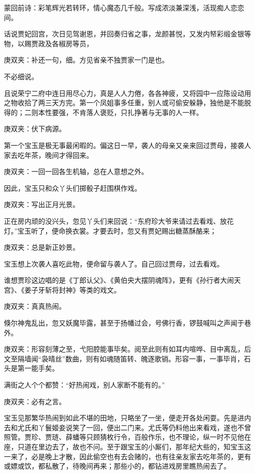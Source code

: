 

\begin{parag}
    \begin{note}蒙回前诗：彩笔辉光若转环，情心魔态几千般。写成浓淡兼深浅，活现痴人恋恋间。\end{note}
\end{parag}


\begin{parag}
    话说贾妃回宫，次日见驾谢恩，并回奏归省之事，龙颜甚悦，又发内帑彩缎金银等物，以赐贾政及各椒房等员，\begin{note}庚双夹：补还一句，细。方见省亲不独贾家一门是也。\end{note}不必细说。
\end{parag}


\begin{parag}
    且说荣宁二府中连日用尽心力，真是人人力倦，各各神疲，又将园中一应陈设动用之物收拾了两三天方完。第一个凤姐事多任重，别人或可偷安躲静，独他是不能脱得的；二则本性要强，不肯落人褒贬，只扎挣著与无事的人一样。\begin{note}庚双夹：伏下病源。\end{note}第一个宝玉是极无事最闲暇的。偏这日一早，袭人的母亲又亲来回过贾母，接袭人家去吃年茶，晚间才得回来。\begin{note}庚双夹：一回一回各生机轴，总在人意想之外。\end{note}因此，宝玉只和众丫头们掷骰子赶围棋作戏。\begin{note}庚双夹：写出正月光景。\end{note}正在房内顽的没兴头，忽见丫头们来回说：“东府珍大爷来请过去看戏、放花灯。”宝玉听了，便命换衣裳。才要去时，忽又有贾妃赐出糖蒸酥酪来；\begin{note}庚双夹：总是新正妙景。\end{note}宝玉想上次袭人喜吃此物，便命留与袭人了。自己回过贾母，过去看戏。
\end{parag}


\begin{parag}
    谁想贾珍这边唱的是《丁郎认父》、《黄伯央大摆阴魂阵》，更有《孙行者大闹天宫》、《姜子牙斩将封神》等类的戏文。\begin{note}庚双夹：真真热闹。\end{note}倏尔神鬼乱出，忽又妖魔毕露，甚至于扬幡过会，号佛行香，锣鼓喊叫之声闻于巷外。\begin{note}庚双夹：形容刻薄之至，弋阳腔能事毕矣。阅至此则有如耳内喧哗、目中离乱，后文至隔墙闻“袅晴丝”数曲，则有如魂随笛转、魄逐歌销。形容一事，一事毕肖，石头是第一能手矣。\end{note}满街之人个个都赞：“好热闹戏，别人家断不能有的。”\begin{note}庚双夹：必有之言。\end{note}宝玉见那繁华热闹到如此不堪的田地，只略坐了一坐，便走开各处闲耍。先是进内去和尤氏和丫鬟姬妾说笑了一回，便出二门来。尤氏等仍料他出来看戏，遂也不曾照管。贾珍、贾琏、薛蟠等只顾猜枚行令，百般作乐，也不理论，纵一时不见他在座，只道在里边去了，故也不问。至于跟宝玉的小厮们，那年纪大些的，知宝玉这一来了，必是晚上才散，因此偷空也有去会赌的，也有往亲友家去吃年茶的，更有或嫖或饮，都私散了，待晚间再来；那些小的，都钻进戏房里瞧热闹去了。
\end{parag}


